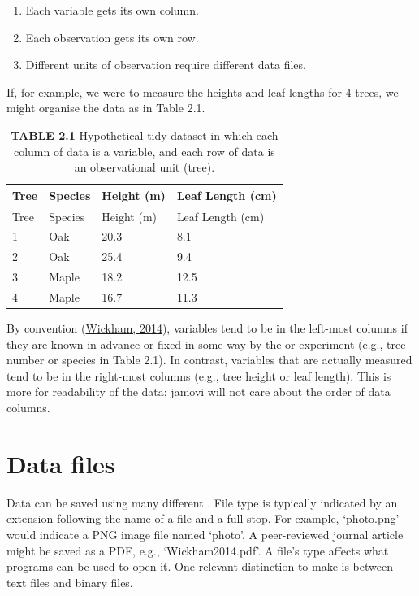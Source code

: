 \documentclass[
  openany]{krantz}
\providecommand{\tightlist}{%
  \setlength{\itemsep}{0pt}\setlength{\parskip}{0pt}}
\begin{document}
\begin{enumerate}
\def\labelenumi{\arabic{enumi}.}
\tightlist
\item
  Each variable gets its own column.
\item
  Each observation gets its own row.
\item
  Different units of observation require different data files.
\end{enumerate}

If, for example, we were to measure the heights and leaf lengths for 4 trees, we might organise the data as in Table 2.1.

\begin{longtable}[]{@{}llll@{}}
\caption{\textbf{TABLE 2.1} Hypothetical tidy dataset in which each column of data is a variable, and each row of data is an observational unit (tree).}\tabularnewline
\toprule
Tree & Species & Height (m) & Leaf Length (cm) \\
\midrule
\endfirsthead
\toprule
Tree & Species & Height (m) & Leaf Length (cm) \\
\midrule
\endhead
1 & Oak & 20.3 & 8.1 \\
2 & Oak & 25.4 & 9.4 \\
3 & Maple & 18.2 & 12.5 \\
4 & Maple & 16.7 & 11.3 \\
\bottomrule
\end{longtable}

By convention (\protect\hyperlink{ref-Wickham2014}{Wickham, 2014}), variables tend to be in the left-most columns if they are known in advance or fixed in some way by the  or experiment (e.g., tree number or species in Table 2.1).
In contrast, variables that are actually measured tend to be in the right-most columns (e.g., tree height or leaf length).
This is more for readability of the data; jamovi will not care about the order of data columns.

\hypertarget{data-files}{%
\section{Data files}\label{data-files}}

Data can be saved using many different .
File type is typically indicated by an extension following the name of a file and a full stop.
For example, `photo.png' would indicate a PNG image file named `photo'.
A peer-reviewed journal article might be saved as a PDF, e.g., `Wickham2014.pdf'.
A file's type affects what programs can be used to open it.
One relevant distinction to make is between text files and binary files.
\end{document}
